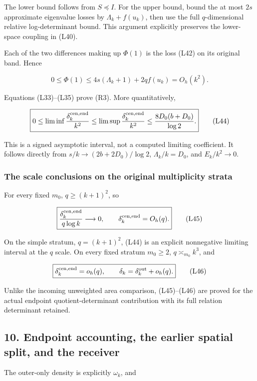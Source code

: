 The lower bound follows from \(S\preceq I\). For the upper bound, bound the at most \(2s\) approximate eigenvalue losses by \(\Lambda_k+f(u_k)\), then use the full \(q\)-dimensional relative log-determinant bound. This argument explicitly preserves the lower-space coupling in (L40).

Each of the two differences making up \(\Phi(1)\) is the loss (L42) on its original band. Hence

\[
\boxed{0\le\Phi(1)\le4s(\Lambda_k+1)+2qf(u_k)=O_h(k^2).}
\tag{L43}
\]

Equations (L33)--(L35) prove (R3). More quantitatively,

\[
\boxed{0\le\liminf\frac{\delta_k^{\rm cen,end}}{k^2}
\le\limsup\frac{\delta_k^{\rm cen,end}}{k^2}
\le\frac{8D_0(b+D_0)}{\log2}.}
\tag{L44}
\]

This is a signed asymptotic interval, not a computed limiting coefficient. It follows directly from \(s/k\to(2b+2D_0)/\log2\), \(\Lambda_k/k=D_0\), and \(E_k/k^2\to0\).

\subsubsection{The scale conclusions on the original multiplicity strata}\label{loc:the-scale-conclusions-on-the-original-multiplicity-strata}

For every fixed \(m_0\), \(q\ge(k+1)^2\), so

\[
\boxed{\frac{\delta_k^{\rm cen,end}}{q\log k}\longrightarrow0,
\qquad \delta_k^{\rm cen,end}=O_h(q).}
\tag{L45}
\]

On the simple stratum, \(q=(k+1)^2\), (L44) is an explicit nonnegative limiting interval at the \(q\) scale. On every fixed stratum \(m_0\ge2\),
\(q\asymp_{m_0}k^3\), and

\[
\boxed{\delta_k^{\rm cen,end}=o_h(q),\qquad
\delta_k=\delta_k^{\rm out}+o_h(q).}
\tag{L46}
\]

Unlike the incoming unweighted area comparison, (L45)--(L46) are proved for the actual endpoint quotient-determinant contribution with its full relation determinant retained.

\subsection{10. Endpoint accounting, the earlier spatial split, and the receiver}\label{loc:endpoint-accounting-the-earlier-spatial-split-and-the-receiver}

The outer-only density is explicitly \(\omega_k\), and

